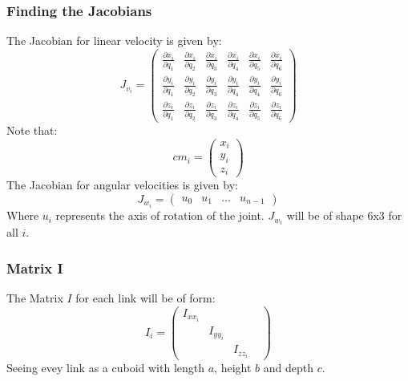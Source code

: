 \documentclass{article}
\begin{document}
\subsubsection{Finding the Jacobians}
The Jacobian for linear velocity is given by:
\begin{equation}
	J_{v_i} = \begin{pmatrix}
	\frac{\partial x_i}{\partial q_1}&\frac{\partial x_i}{\partial q_2}&\frac{\partial x_i}{\partial q_3}&\frac{\partial x_i}{\partial q_4}&\frac{\partial x_i}{\partial q_5}&\frac{\partial x_i}{\partial q_6}\\
	\frac{\partial y_i}{\partial q_1}&\frac{\partial y_i}{\partial q_2}&\frac{\partial y_i}{\partial q_3}&\frac{\partial y_i}{\partial q_4}&\frac{\partial y_i}{\partial q_4}&\frac{\partial y_i}{\partial q_6}\\
	\frac{\partial z_i}{\partial q_1}&\frac{\partial z_i}{\partial q_2}&\frac{\partial z_i}{\partial q_3}&\frac{\partial z_i}{\partial q_4}&\frac{\partial z_i}{\partial q_5}&\frac{\partial z_i}{\partial q_6}
	\end{pmatrix}
\end{equation}
Note that:
\begin{equation}
cm_i = \begin{pmatrix}
	x_i\\y_i\\z_i
	\end{pmatrix}
\end{equation}
The Jacobian for angular velocities is given by:
\begin{equation}
J_{w_i} = \begin{pmatrix}
	u_{0}&u_{1}&...&u_{n-1}
	\end{pmatrix}
\end{equation}
Where $u_i$ represents the axis of rotation of the joint. $J_{w_i}$ will be of shape 6x3 for all $i$.
\subsubsection{Matrix I}
The Matrix $I$ for each link will be of form:
\begin{equation}
I_i = \begin{pmatrix}
	I_{xx_i}&&\\
	&I_{yy_i}&\\
	&&I_{zz_i}&	\end{pmatrix}
\end{equation}
Seeing evey link as a cuboid with length $a$, height $b$ and depth $c$.
\end{document}
